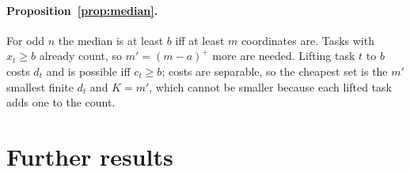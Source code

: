 \documentclass{article}
\begin{document}
\paragraph{Proposition~\ref{prop:median}.} For odd $n$ the median is at least $b$ iff at least $m$ coordinates are. Tasks with $x_t\ge b$ already count, so $m'=(m-a)^+$ more are needed. Lifting task $t$ to $b$ costs $d_t$ and is possible iff $c_t\ge b$; costs are separable, so the cheapest set is the $m'$ smallest finite $d_t$ and $K=m'$, which cannot be smaller because each lifted task adds one to the count.

\section{Further results}
\label{app:more}
\begin{table}[h]
\caption{Closed forms (Propositions~\ref{prop:mean}--\ref{prop:median}) against the exact solvers and an independent generic LP/MILP (60-target sample), over all caps. Generated by \texttt{figures/src/tables.py} from \texttt{results/theory\_check.csv}.}
\label{tab:T2}
\centering\scriptsize

\end{table}
\end{document}
